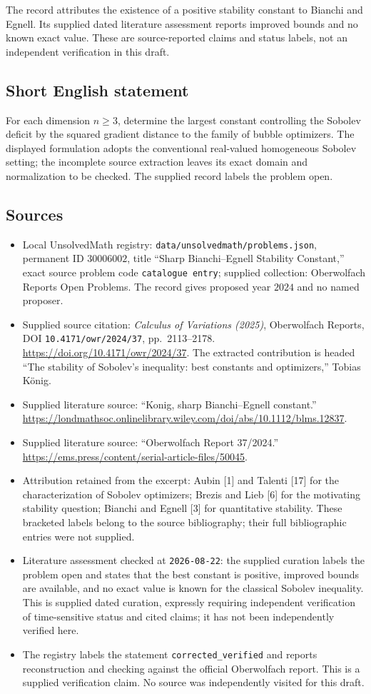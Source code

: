 \documentclass[11pt]{article}
\begin{document}
The record attributes the existence of a positive stability constant to Bianchi and Egnell. Its supplied dated literature assessment reports improved bounds and no known exact value. These are source-reported claims and status labels, not an independent verification in this draft.
\subsection{Short English statement}
For each dimension \(n\geq3\), determine the largest constant controlling the Sobolev deficit by the squared gradient distance to the family of bubble optimizers. The displayed formulation adopts the conventional real-valued homogeneous Sobolev setting; the incomplete source extraction leaves its exact domain and normalization to be checked. The supplied record labels the problem open.
\subsection{Sources}
\begin{itemize}
\item Local UnsolvedMath registry: \texttt{data/unsolvedmath/problems.json}, permanent ID \(30006002\), title ``Sharp Bianchi--Egnell Stability Constant,'' exact source problem code \texttt{catalogue entry}; supplied collection: Oberwolfach Reports Open Problems. The record gives proposed year \(2024\) and no named proposer.
\item Supplied source citation: \emph{Calculus of Variations (2025)}, Oberwolfach Reports, DOI \texttt{10.4171/owr/2024/37}, pp.\ 2113--2178. \url{https://doi.org/10.4171/owr/2024/37}. The extracted contribution is headed ``The stability of Sobolev's inequality: best constants and optimizers,'' Tobias K\"onig.
\item Supplied literature source: ``Konig, sharp Bianchi--Egnell constant.'' \url{https://londmathsoc.onlinelibrary.wiley.com/doi/abs/10.1112/blms.12837}.
\item Supplied literature source: ``Oberwolfach Report 37/2024.'' \url{https://ems.press/content/serial-article-files/50045}.
\item Attribution retained from the excerpt: Aubin [1] and Talenti [17] for the characterization of Sobolev optimizers; Brezis and Lieb [6] for the motivating stability question; Bianchi and Egnell [3] for quantitative stability. These bracketed labels belong to the source bibliography; their full bibliographic entries were not supplied.
\item Literature assessment checked at \texttt{2026-08-22}: the supplied curation labels the problem open and states that the best constant is positive, improved bounds are available, and no exact value is known for the classical Sobolev inequality. This is supplied dated curation, expressly requiring independent verification of time-sensitive status and cited claims; it has not been independently verified here.
\item The registry labels the statement \texttt{corrected\_verified} and reports reconstruction and checking against the official Oberwolfach report. This is a supplied verification claim. No source was independently visited for this draft.
\end{itemize}
\end{document}
